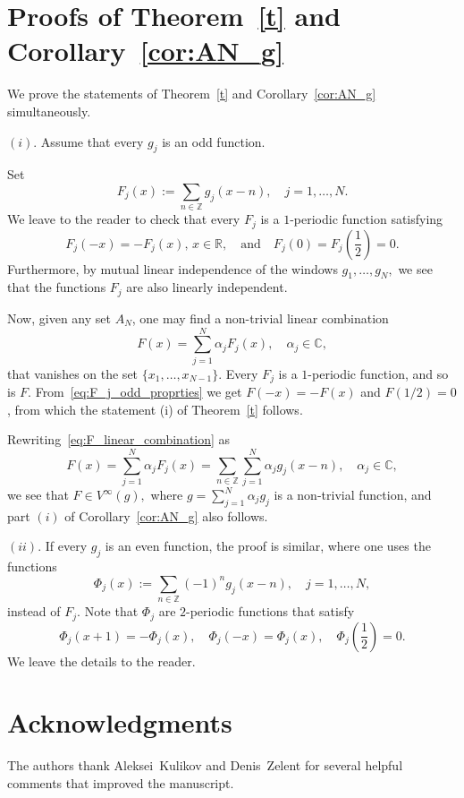 \documentclass[12pt]{amsart}
\numberwithin{equation}{section}
\newcommand{\R}{{\mathbb R}} \newcommand{\Q}{{\mathbb Q}} \newcommand{\Z}{{\mathbb Z}} \newcommand{\N}{{\mathbb N}}
\newcommand{\Cc}{{\mathbb C}}\newcommand{\vv}{{\bf v}} \newcommand{\zz}{{\bf z}} \newcommand{\xx}{{\bf x}} \newcommand{\yy}{{\bf y}}\newcommand{\uu}{{\bf u}}
\begin{document}
\section{Proofs of Theorem~\ref{t} and Corollary~\ref{cor:AN_g} }


We prove the statements of Theorem~\ref{t} and Corollary~\ref{cor:AN_g} simultaneously.

$(i)$. Assume that every $g_j$ is an odd function.

Set $$F_j(x):=\sum_{n\in\Z}g_j(x-n), \quad j=1,\dots,N.$$
We leave to the reader to check that every $F_j$ is a $1$-periodic function satisfying 
\begin{equation}\label{eq:F_j_odd_proprties}
    F_j(-x)=-F_j(x), \, x\in\R, \quad \text{and} \quad F_j(0)=F_j\left(\frac{1}{2}\right)=0.
\end{equation}
Furthermore, by mutual linear independence of the windows $g_1, \dots, g_{N},$ we see that the functions $F_j$ are also linearly independent.

Now, given any set $A_N$, one may find a non-trivial linear combination
\begin{equation}\label{eq:F_linear_combination}
F(x)=\sum_{j=1}^N\alpha_j F_j(x), \quad \alpha_j \in \Cc,    
\end{equation}
that vanishes on the set $\{x_1,\dots,x_{N-1}\}$. Every $F_j$ is a $1$-periodic function, and so is $F$.
From~\eqref{eq:F_j_odd_proprties} we get $F(-x)=-F(x)$ and $F(1/2)=0$, from which the statement (i) of Theorem~\ref{t} follows. 

Rewriting~\eqref{eq:F_linear_combination} as
$$F(x)=\sum_{j=1}^N\alpha_j F_j(x) = \sum\limits_{n\in\Z}\sum_{j=1}^N\alpha_j g_j(x-n), \quad \alpha_j \in \Cc,$$
we see that $F\in V^{\infty}(g),$ where $g=\sum\limits_{j=1}^N \alpha_j g_j$ is a non-trivial function, and part $(i)$ of Corollary~\ref{cor:AN_g} also follows. 

$(ii)$. If every $g_j$ is an even function, the proof is similar, where one uses the functions $$ \Phi_j(x):=\sum_{n\in\Z}(-1)^ng_j(x-n), \quad j=1,\dots,N, $$  instead of $F_j$. Note that $\Phi_j$ are $2$-periodic functions that satisfy
$$
\Phi_j(x+1) =- \Phi_j(x), \quad \Phi_j(-x) = \Phi_j(x), \quad \Phi_j\left(\frac{1}{2}\right) = 0.
$$
We leave the details to the reader.

\section{Acknowledgments}
The authors thank Aleksei~Kulikov and Denis~Zelent for several helpful comments that improved the manuscript.
\end{document}
